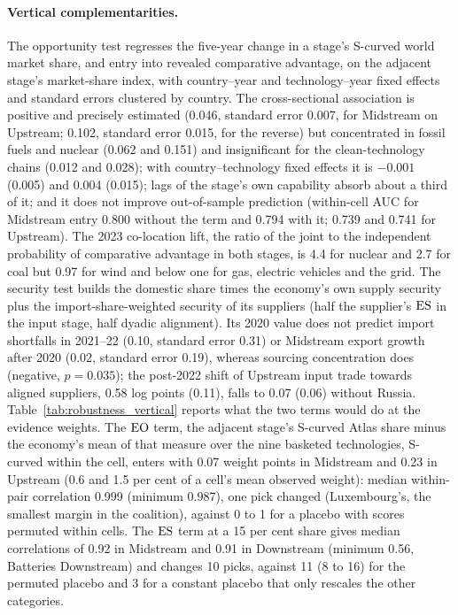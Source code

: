 

\paragraph{Vertical complementarities.} The opportunity test regresses the five-year change in a
stage's S-curved world market share, and entry into revealed comparative advantage, on the adjacent
stage's market-share index, with country--year and technology--year fixed effects and standard
errors clustered by country. The cross-sectional association is positive and precisely estimated
(0.046, standard error 0.007, for Midstream on Upstream; 0.102, standard error 0.015, for the
reverse) but concentrated in fossil fuels and nuclear (0.062 and 0.151) and insignificant for the
clean-technology chains (0.012 and 0.028); with country--technology fixed effects it is $-0.001$
(0.005) and 0.004 (0.015); lags of the stage's own capability absorb about a third of it; and it does
not improve out-of-sample prediction (within-cell AUC for Midstream entry 0.800 without the term and
0.794 with it; 0.739 and 0.741 for Upstream). The 2023 co-location lift, the ratio of the joint to
the independent probability of comparative advantage in both stages, is 4.4 for nuclear and 2.7 for
coal but 0.97 for wind and below one for gas, electric vehicles and the grid. The security test builds
the domestic share times the economy's own supply security plus the import-share-weighted security of
its suppliers (half the supplier's $\mathrm{ES}$ in the input stage, half dyadic alignment). Its 2020 value
does not predict import shortfalls in 2021--22 (0.10, standard error 0.31) or Midstream export
growth after 2020 (0.02, standard error 0.19), whereas sourcing concentration does (negative,
$p=0.035$); the post-2022 shift of Upstream input trade towards aligned suppliers, 0.58 log points
(0.11), falls to 0.07 (0.06) without Russia. Table~\ref{tab:robustness_vertical} reports what the two
terms would do at the evidence weights. The $\mathrm{EO}$ term, the adjacent stage's S-curved Atlas share
minus the economy's mean of that measure over the nine basketed technologies, S-curved within the
cell, enters with 0.07 weight points in Midstream and 0.23 in Upstream (0.6 and 1.5 per cent of a
cell's mean observed weight): median within-pair correlation 0.999 (minimum 0.987), one pick changed
(Luxembourg's, the smallest margin in the coalition), against 0 to 1 for a placebo with scores
permuted within cells. The $\mathrm{ES}$ term at a 15 per cent share gives median correlations of 0.92 in
Midstream and 0.91 in Downstream (minimum 0.56, Batteries Downstream) and changes 10 picks, against
11 (8 to 16) for the permuted placebo and 3 for a constant placebo that only rescales the other
categories.


